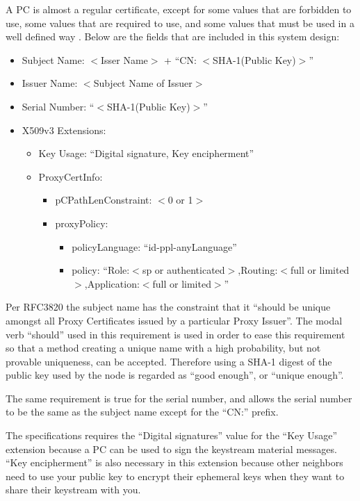 A \ac{PC} is almost a regular certificate, except for some values that are
forbidden to use, some values that are required to use, and some values that
must be used in a well defined way \cite{rfc3820}. Below are the
fields that are included in this system design:
\begin{itemize}
  \item Subject Name: $<$Isser Name$>$ + ``CN: $<$SHA-1(Public Key)$>$''
  \item Issuer Name: $<$Subject Name of Issuer$>$
  \item Serial Number: ``$<$SHA-1(Public Key)$>$''
  \item X509v3 Extensions:
  \begin{itemize}
    \item Key Usage: ``Digital signature, Key encipherment''
    \item ProxyCertInfo:
    \begin{itemize}
      \item pCPathLenConstraint: $<$0 or 1$>$
      \item proxyPolicy: 
      \begin{itemize}
        \item policyLanguage: ``id-ppl-anyLanguage''
        \item policy: ``Role:$<$sp or authenticated$>$,Routing:$<$full or limited$>$,Application:$<$full or limited$>$''
      \end{itemize}
    \end{itemize}
  \end{itemize}
\end{itemize}
Per RFC3820 \cite{rfc3820} the subject name has the constraint that it
``should be unique amongst all Proxy Certificates issued by a particular Proxy
Issuer''. The modal verb ``should'' used in this requirement is used in order
to ease this requirement so that a method creating a unique name with a high
probability, but not provable uniqueness, can be accepted. Therefore using a
SHA-1 digest of the public key used by the node is regarded as ``good enough'',
or ``unique enough''.

The same requirement is true for the serial number, and allows the serial number
to be the same as the subject name except for the ``CN:'' prefix.

The specifications requires the ``Digital signatures'' value for the ``Key
Usage'' extension because a \ac{PC} can be used to sign the keystream material
messages. ``Key encipherment'' is also necessary in this extension because other
neighbors need to use your public key to encrypt their ephemeral keys when they
want to share their keystream with you.

